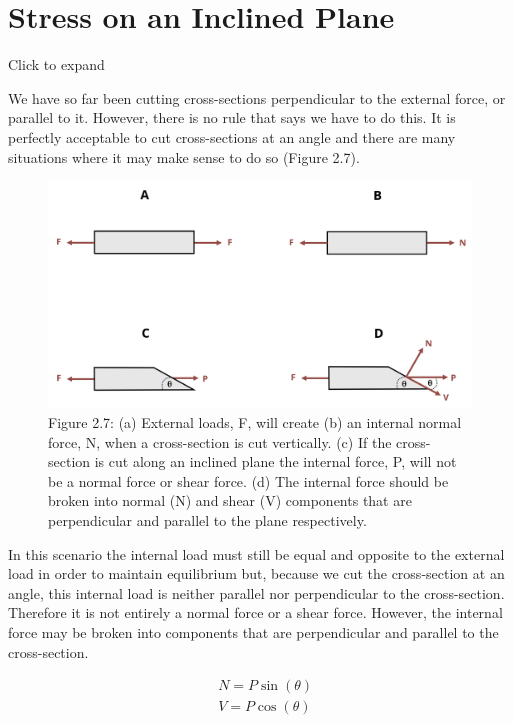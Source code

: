 \documentclass[
  letterpaper,
  DIV=11,
  numbers=noendperiod]{scrreprt}
\theoremstyle{definition}
\theoremstyle{remark}
\begin{document}
\section{Stress on an Inclined Plane}\label{sec-2.4}

Click to expand

We have so far been cutting cross-sections perpendicular to the external
force, or parallel to it. However, there is no rule that says we have to
do this. It is perfectly acceptable to cut cross-sections at an angle
and there are many situations where it may make sense to do so (Figure
2.7).

\begin{figure}[H]

{\centering \includegraphics{images/CH2 figures/2.7.png}

}

\caption{Figure 2.7: (a) External loads, F, will create (b) an internal
normal force, N, when a cross-section is cut vertically. (c) If the
cross-section is cut along an inclined plane the internal force, P, will
not be a normal force or shear force. (d) The internal force should be
broken into normal (N) and shear (V) components that are perpendicular
and parallel to the plane respectively.}

\end{figure}%

In this scenario the internal load must still be equal and opposite to
the external load in order to maintain equilibrium but, because we cut
the cross-section at an angle, this internal load is neither parallel
nor perpendicular to the cross-section. Therefore it is not entirely a
normal force or a shear force. However, the internal force may be broken
into components that are perpendicular and parallel to the
cross-section.

\[
\begin{aligned}
& N=P \sin (\theta) \\
& V=P \cos (\theta)
\end{aligned}
\]
\end{document}
